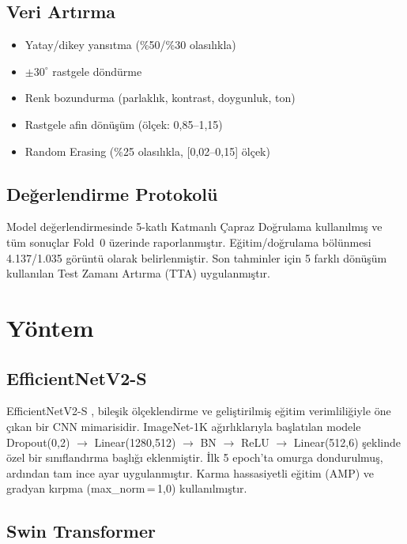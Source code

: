 \documentclass[conference]{IEEEtran}
\begin{document}
\subsection{Veri Artırma}

\begin{itemize}
    \item Yatay/dikey yansıtma (\%50/\%30 olasılıkla)
    \item $\pm30^{\circ}$ rastgele döndürme
    \item Renk bozundurma (parlaklık, kontrast, doygunluk, ton)
    \item Rastgele afin dönüşüm (ölçek: 0,85--1,15)
    \item Random Erasing (\%25 olasılıkla, [0,02--0,15] ölçek)
\end{itemize}

\subsection{Değerlendirme Protokolü}

Model değerlendirmesinde 5-katlı Katmanlı Çapraz Doğrulama kullanılmış ve tüm sonuçlar Fold~0 üzerinde raporlanmıştır. Eğitim/doğrulama bölünmesi 4.137/1.035 görüntü olarak belirlenmiştir. Son tahminler için 5 farklı dönüşüm kullanılan Test Zamanı Artırma (TTA) uygulanmıştır.

\section{Yöntem}

\subsection{EfficientNetV2-S}

EfficientNetV2-S \cite{tan2021}, bileşik ölçeklendirme ve geliştirilmiş eğitim verimliliğiyle öne çıkan bir CNN mimarisidir. ImageNet-1K ağırlıklarıyla başlatılan modele Dropout(0,2) $\rightarrow$ Linear(1280,512) $\rightarrow$ BN $\rightarrow$ ReLU $\rightarrow$ Linear(512,6) şeklinde özel bir sınıflandırma başlığı eklenmiştir. İlk 5 epoch'ta omurga dondurulmuş, ardından tam ince ayar uygulanmıştır. Karma hassasiyetli eğitim (AMP) ve gradyan kırpma (max\_norm\,=\,1,0) kullanılmıştır.

\subsection{Swin Transformer}
\end{document}
